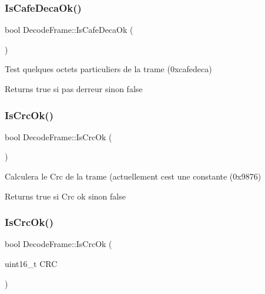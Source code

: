 \subsubsection{\texorpdfstring{Is\+Cafe\+Deca\+Ok()}{IsCafeDecaOk()}}
{\footnotesize\ttfamily bool Decode\+Frame\+::\+Is\+Cafe\+Deca\+Ok (\begin{DoxyParamCaption}{ }\end{DoxyParamCaption})\hspace{0.3cm}{\ttfamily [inline]}}



Test quelques octets particuliers de la trame (0xcafedeca) 

\begin{DoxyReturn}{Returns}
true si pas d\textquotesingle{}erreur sinon false 
\end{DoxyReturn}
\mbox{\label{classDecodeFrame_a239ca7a7a2ffe98f2221137a6119139d}} 
\subsubsection{\texorpdfstring{Is\+Crc\+Ok()}{IsCrcOk()}\hspace{0.1cm}{\footnotesize\ttfamily [1/2]}}
{\footnotesize\ttfamily bool Decode\+Frame\+::\+Is\+Crc\+Ok (\begin{DoxyParamCaption}{ }\end{DoxyParamCaption})\hspace{0.3cm}{\ttfamily [inline]}}



Calculera le Crc de la trame (actuellement c\textquotesingle{}est une constante (0x9876) 

\begin{DoxyReturn}{Returns}
true si Crc ok sinon false 
\end{DoxyReturn}
\mbox{\label{classDecodeFrame_a2e091adf918a4407f9a476f81a32f27a}} 
\subsubsection{\texorpdfstring{Is\+Crc\+Ok()}{IsCrcOk()}\hspace{0.1cm}{\footnotesize\ttfamily [2/2]}}
{\footnotesize\ttfamily bool Decode\+Frame\+::\+Is\+Crc\+Ok (\begin{DoxyParamCaption}\item[{uint16\+\_\+t}]{C\+RC }\end{DoxyParamCaption})\hspace{0.3cm}{\ttfamily [inline]}}

